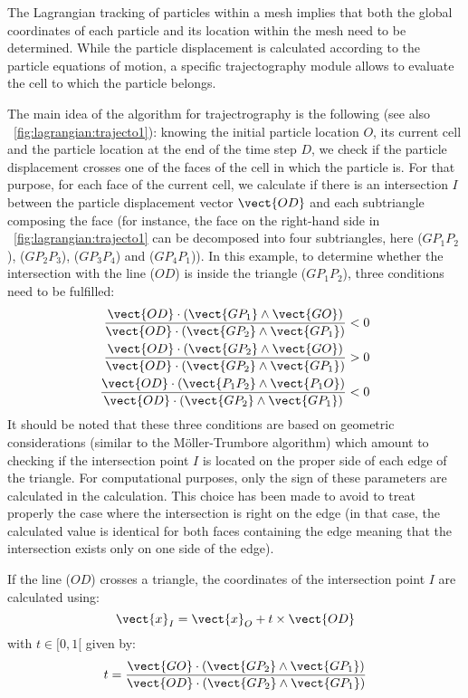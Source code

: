 The Lagrangian tracking of particles within a mesh implies that both the global coordinates of each particle and its location within the mesh need to be determined. While the particle displacement is calculated according to the particle equations of motion, a specific trajectography module allows to evaluate the cell to which the particle belongs.

The main idea of the algorithm for trajectrography is the following (see also \figurename{}~\ref{fig:lagrangian:trajecto1}): knowing the initial particle location $O$, its current cell and the particle location at the end of the time step $D$, we check if the particle displacement crosses one of the faces of the cell in which the particle is. For that purpose, for each face of the current cell, we calculate if there is an intersection $I$ between the particle displacement vector $\vect{OD}$ and each subtriangle composing the face (for instance, the face on the right-hand side in \figurename{}~\ref{fig:lagrangian:trajecto1} can be decomposed into four subtriangles, here ($GP_1P_2$), ($GP_2P_3$), ($GP_3P_4$) and ($GP_4P_1$)). In this example, to determine whether the intersection with the line ($OD$) is inside the triangle ($GP_1P_2$), three conditions need to be fulfilled:
\begin{subequations}
\begin{align}
 \frac{\vect{OD}\cdot(\vect{GP_1}\wedge\vect{GO})}{\vect{OD}\cdot(\vect{GP_2}\wedge\vect{GP_1})} < 0 \\
 \frac{\vect{OD}\cdot(\vect{GP_2}\wedge\vect{GO})}{\vect{OD}\cdot(\vect{GP_2}\wedge\vect{GP_1})} > 0  \\
 \frac{\vect{OD}\cdot(\vect{P_1P_2}\wedge\vect{P_1O})}{\vect{OD}\cdot(\vect{GP_2}\wedge\vect{GP_1})} < 0
\end{align}
\label{eq:lagrangian:trajecto_1}
\end{subequations}
It should be noted that these three conditions are based on geometric considerations (similar to the M\"{o}ller-Trumbore algorithm) which amount to checking if the intersection point $I$ is located on the proper side of each edge of the triangle. For computational purposes, only the sign of these parameters are calculated in the calculation. This choice has been made to avoid to treat properly the case where the intersection is right on the edge (in that case, the calculated value is identical for both faces containing the edge meaning that the intersection exists only on one side of the edge).

If the line ($OD$) crosses a triangle, the coordinates of the intersection point $I$ are calculated using:
\begin{equation}
 \vect{x}_I = \vect{x}_O + t \times \vect{OD}
\label{eq:lagrangian:trajecto_2}
\end{equation}
with $t\in [0,1[$ given by:
\begin{equation}
 t =  \frac{\vect{GO}\cdot(\vect{GP_2}\wedge\vect{GP_1})}{\vect{OD}\cdot(\vect{GP_2}\wedge\vect{GP_1})}
\label{eq:lagrangian:trajecto_3}
\end{equation}

